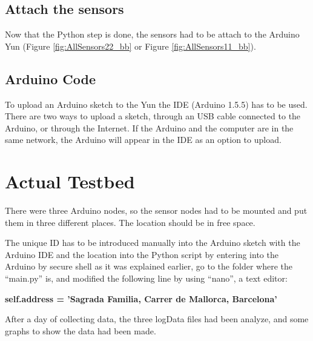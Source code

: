 \documentclass[12pt, a4paper,twoside]{tesi_upf}
\begin{document}
  \subsection{Attach the sensors}
    Now that the Python step is done, the sensors had to be attach to the Arduino Yun (Figure \ref{fig:AllSensors22_bb} or Figure \ref{fig:AllSensors11_bb}).
  
  \subsection{Arduino Code}
    To upload an Arduino sketch to the Yun the IDE (Arduino 1.5.5) has to be used. There are two ways to upload a sketch, through an USB cable connected to the Arduino, or through the Internet. If the Arduino and the computer are in the same network, the Arduino will appear in the IDE as an option to upload.
  
  \section{Actual Testbed}
    There were three Arduino nodes, so the sensor nodes had to be mounted and put them in three different places. The location should be in free space.
    
    The unique ID has to be introduced manually into the Arduino sketch with the Arduino IDE and the location into the Python script by entering into the Arduino by secure shell as it was explained earlier, go to the folder where the ``main.py'' is, and modified the following line by using ``nano'', a text editor:
    
    {\begin{centering} \textbf{self.address = 'Sagrada Familia, Carrer de Mallorca, Barcelona'}\par \end{centering}}
    
    After a day of collecting data, the three logData files had been analyze, and some graphs to show the data had been made.
    
\end{document}
